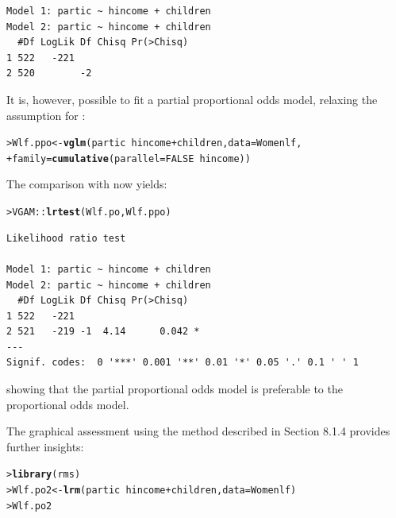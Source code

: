 \documentclass[10pt]{report}\usepackage[]{graphicx}\usepackage[]{color}
\makeatletter
\newcommand{\hlnum}[1]{\textcolor[rgb]{0.686,0.059,0.569}{#1}}%
\newcommand{\hlopt}[1]{\textcolor[rgb]{0,0,0}{#1}}%
\newcommand{\hlstd}[1]{\textcolor[rgb]{0.345,0.345,0.345}{#1}}%
\newcommand{\hlkwb}[1]{\textcolor[rgb]{0.69,0.353,0.396}{#1}}%
\newcommand{\hlkwc}[1]{\textcolor[rgb]{0.333,0.667,0.333}{#1}}%
\newcommand{\hlkwd}[1]{\textcolor[rgb]{0.737,0.353,0.396}{\textbf{#1}}}%
\newenvironment{kframe}{%
 \def\at@end@of@kframe{}%
 \ifinner\ifhmode%
  \def\at@end@of@kframe{\end{minipage}}%
  \begin{minipage}{\columnwidth}%
 \fi\fi%
 \def\FrameCommand##1{\hskip\@totalleftmargin \hskip-\fboxsep
 \colorbox{shadecolor}{##1}\hskip-\fboxsep
     \hskip-\linewidth \hskip-\@totalleftmargin \hskip\columnwidth}%
 \MakeFramed {\advance\hsize-\width
   \@totalleftmargin\z@ \linewidth\hsize
   \@setminipage}}%
 {\par\unskip\endMakeFramed%
 \at@end@of@kframe}
\newenvironment{knitrout}{}{} %
\renewenvironment{knitrout}{\small\renewcommand{\baselinestretch}{.85}}{} %
\makeatother
\begin{document}
\begin{Exercises}
\begin{ans}
\begin{knitrout}
\begin{kframe}
\begin{verbatim}
Model 1: partic ~ hincome + children
Model 2: partic ~ hincome + children
  #Df LogLik Df Chisq Pr(>Chisq)
1 522   -221                    
2 520        -2                 
\end{verbatim}
\end{kframe}
\end{knitrout}
    It is, however, possible to fit a partial proportional odds model,
    relaxing the assumption for :
\begin{knitrout}\footnotesize
{}\color{fgcolor}\begin{kframe}
\begin{alltt}
\hlstd{> }\hlstd{Wlf.ppo} \hlkwb{<-} \hlkwd{vglm}\hlstd{(partic} \hlopt{~} \hlstd{hincome} \hlopt{+} \hlstd{children,} \hlkwc{data} \hlstd{= Womenlf,}
\hlstd{+ }                \hlkwc{family} \hlstd{=} \hlkwd{cumulative}\hlstd{(}\hlkwc{parallel} \hlstd{=} \hlnum{FALSE} \hlopt{~} \hlstd{hincome))}
\end{alltt}
\end{kframe}
\end{knitrout}
    The comparison with  now yields:
\begin{knitrout}\footnotesize
{}\color{fgcolor}\begin{kframe}
\begin{alltt}
\hlstd{> }\hlstd{VGAM}\hlopt{::}\hlkwd{lrtest}\hlstd{(Wlf.po, Wlf.ppo)}
\end{alltt}
\begin{verbatim}
Likelihood ratio test

Model 1: partic ~ hincome + children
Model 2: partic ~ hincome + children
  #Df LogLik Df Chisq Pr(>Chisq)  
1 522   -221                      
2 521   -219 -1  4.14      0.042 *
---
Signif. codes:  0 '***' 0.001 '**' 0.01 '*' 0.05 '.' 0.1 ' ' 1
\end{verbatim}
\end{kframe}
\end{knitrout}
    showing that the partial proportional odds model is preferable to
    the proportional odds model.
    
    The graphical assessment using the method described in Section
    8.1.4 provides further insights:
\begin{knitrout}\footnotesize
{}\color{fgcolor}\begin{kframe}
\begin{alltt}
\hlstd{> }\hlkwd{library}\hlstd{(rms)}
\hlstd{> }\hlstd{Wlf.po2} \hlkwb{<-} \hlkwd{lrm}\hlstd{(partic} \hlopt{~} \hlstd{hincome} \hlopt{+} \hlstd{children,} \hlkwc{data} \hlstd{= Womenlf)}
\hlstd{> }\hlstd{Wlf.po2}
\end{alltt}
\begin{verbatim}


\end{verbatim}
\end{kframe}
\end{knitrout}
\end{ans}
\end{Exercises}
\end{document}
